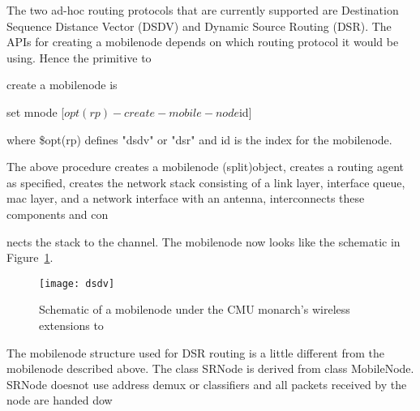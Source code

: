 
The two ad-hoc routing protocols that are currently supported are Destination Sequence Distance Vector (DSDV) and Dynamic Source Routing (DSR). The APIs for creating a mobilenode depends on which routing protocol it would be using. Hence the primitive to 





















create a mobilenode is

\begin{program}
	set mnode [$opt(rp)-create-mobile-node $id] 
\end{program}
where \$opt(rp) defines "dsdv" or "dsr" and id is the index for the mobilenode.

The above procedure creates a mobilenode (split)object, creates a routing agent as specified, creates the network stack consisting of a link layer, interface queue, mac layer, and a network interface with an antenna, interconnects these components and con





















nects the stack to the channel. The mobilenode now looks like the schematic in Figure~\ref{fig:mobilenode-dsdv}. 
\begin{figure}
    \centerline{\texttt{[image: dsdv]}}
    \caption{Schematic of a mobilenode under the CMU monarch's wireless extensions to \ns}
    \label{fig:mobilenode-dsdv}
\end{figure}

The mobilenode structure used for DSR routing is a little different from the mobilenode described above. The class SRNode is derived from class MobileNode. SRNode doesnot use address demux or classifiers and all packets received by the node are handed dow






















